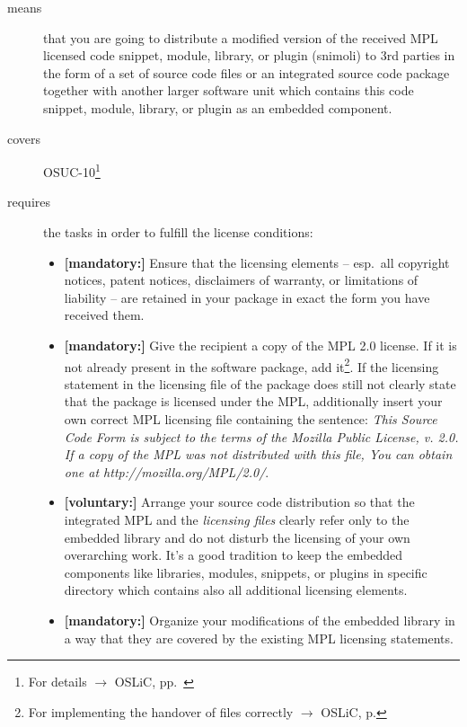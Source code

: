 \begin{description}
\item[means] that you are going to distribute a modified version of the received
MPL licensed code snippet, module, library, or plugin (snimoli) to 3rd
parties in the form of a set of source code files or an integrated source code
package together with another larger software unit which contains this code
snippet, module, library, or plugin as an embedded component.
\item[covers] OSUC-10\footnote{For details $\rightarrow$ OSLiC, pp.\ \pageref{OSUC-10-DEF}}
\item[requires] the tasks in order to fulfill the license conditions:
\begin{itemize}

  \item \textbf{[mandatory:]} Ensure that the licensing elements -- esp.\ all
  copyright notices, patent notices, disclaimers of warranty, or limitations of
  liability -- are retained in your package in exact the form you have received
  them.
  
  \item \textbf{[mandatory:]} Give the recipient a copy of the MPL 2.0 license.
  If it is not already present in the software package, add it\footnote{For
  implementing the handover of files correctly $\rightarrow$ OSLiC, p.
  \pageref{DistributingFilesHint}}. If the licensing statement in the licensing
  file of the package does still not clearly state that the package is licensed
  under the MPL, additionally insert your own correct MPL licensing file
  containing the sentence: \emph{This Source Code Form is subject to the terms
  of the Mozilla Public License, v. 2.0. If a copy of the MPL was not
  distributed with this file, You can obtain one at
  http://mozilla.org/MPL/2.0/}.

  \item \textbf{[voluntary:]} Arrange your source code distribution so that the
  integrated MPL and the \emph{licensing files} clearly refer only to the
  embedded library and do not disturb the licensing of your own overarching
  work. It's a good tradition to keep the embedded components like libraries,
  modules, snippets, or plugins in specific directory which contains also all
  additional licensing elements.
  
  \item \textbf{[mandatory:]} Organize your modifications of the embedded
  library in a way that they are covered by the existing MPL licensing
  statements. 


\end{itemize}
\end{description}
